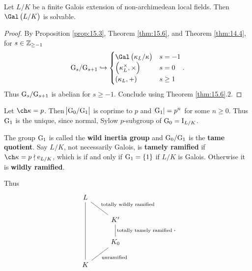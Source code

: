 
\begin{corollary}
Let $ L / K $ be a finite Galois extension of non-archimedean local fields. Then $ \Gal\br{L / K} $ is solvable.
\end{corollary}

\begin{proof}
By Proposition \ref{prop:15.3}, Theorem \ref{thm:15.6}, and Theorem \ref{thm:14.4}, for $ s \in \mathbb{Z}_{\ge -1} $
$$ \G_s / \G_{s + 1} \hookrightarrow
\begin{cases}
\Gal\br{\kappa_L / \kappa} & s = -1 \\
\br{\kappa_L^\times, \times} & s = 0 \\
\br{\kappa_L, +} & s \ge 1
\end{cases}.
$$
Thus $ \mathrm{G}_s / \mathrm{G}_{s + 1} $ is abelian for $ s \ge -1 $. Conclude using Theorem \ref{thm:15.6}.$ 2 $.
\end{proof}

Let $ \ch \kappa = p $. Then $ \abs{\mathrm{G}_0 / \mathrm{G}_1} $ is coprime to $ p $ and $ \abs{\mathrm{G}_1} = p^n $ for some $ n \ge 0 $. Thus $ \mathrm{G}_1 $ is the unique, since normal, Sylow $ p $-subgroup of $ \mathrm{G}_0 = \mathrm{I}_{L / K} $.

\begin{definition}
The group $ \mathrm{G}_1 $ is called the \textbf{wild inertia group} and $ \mathrm{G}_0 / \mathrm{G}_1 $ is the \textbf{tame quotient}. Say $ L / K $, not necessarily Galois, is \textbf{tamely ramified} if $ \ch \kappa = p \nmid \e_{L / K} $, which is if and only if $ \G_1 = \cbr{1} $ if $ L / K $ is Galois. Otherwise it is \textbf{wildly ramified}.
\end{definition}

Thus
$$
\begin{tikzcd}
L \arrow[dash]{dr}{\text{totally wildly ramified}} \arrow[dash]{ddd} & \\
& K' \arrow[dash]{d}{\text{totally tamely ramified}} \\
& K_0 \arrow[dash]{dl}{\text{unramified}} \\
K &
\end{tikzcd}.
$$

\pagebreak

